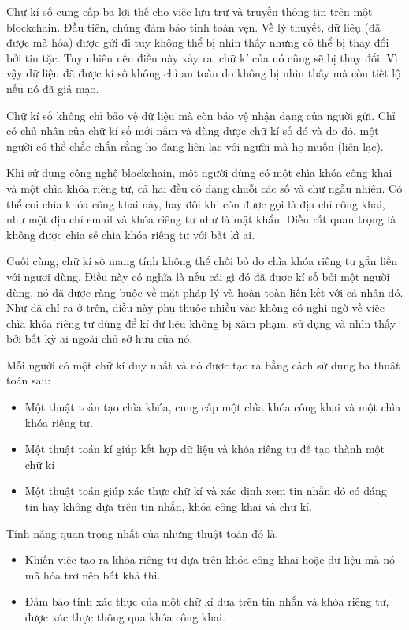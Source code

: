  Chữ kí số cung cấp ba lợi thế cho việc lưu trữ và truyền thông tin trên một blockchain. Đầu tiên, chúng đảm bảo tính toàn vẹn. Về lý thuyết, dữ liêụ (đã được mã hóa) được gửi đi tuy không thể bị nhìn thấy nhưng có thể bị thay đổi bởi tin tặc. Tuy nhiên nếu điều này xảy ra, chữ kí của nó cũng sẽ bị thay đổi. Vì vậy dữ liệu đã được kí số không chỉ an toàn do không bị nhìn thấy mà còn tiết lộ nếu nó đã giả mạo.
 
 Chữ kí số không chỉ bảo vệ dữ liệu mà còn bảo vệ nhận dạng của người gửi. Chỉ có chủ nhân của chữ kí số mới nắm và dùng được chữ kí số đó và do đó, một người có thể chắc chắn rằng họ đang liên lạc với người mà họ muốn (liên lạc).
 
 Khi sử dụng công nghệ blockchain, một người dùng có một chìa khóa công khai và một chìa khóa riêng tư, cả hai đều có dạng chuỗi các số và chữ ngẫu nhiên. Có thể coi chìa khóa công khai này, hay đôi khi còn được gọi là địa chỉ công khai, như một địa chỉ email và khóa riêng tư như là mật khẩu. Điều rất quan trọng là không được chia sẻ chìa khóa riêng tư với bất kì ai.
 
 Cuối cùng, chữ kí số mang tính không thể chối bỏ do chìa khóa riêng tư gắn liền với ngươi dùng. Điều này có nghĩa là nếu cái gì đó đã được kí số bởi một người dùng, nó đã được ràng buộc về mặt pháp lý và hoàn toàn liên kết với cá nhân đó. Như đã chỉ ra ở trên, điều này phụ thuộc nhiều vào không có nghi ngờ về việc chìa khóa riêng tư dùng để kí dữ liệu không bị xâm phạm, sử dụng và nhìn thấy bởi bất kỳ ai ngoài chủ sở hữu của nó. 
 
 Mỗi người có một chữ kí duy nhất và nó được tạo ra bằng cách sử dụng ba thuât toán sau:
 \begin{itemize}
   \item  Một thuật toán tạo chìa khóa, cung cấp một chìa khóa công khai và một chìa khóa riêng tư.
 \item Một thuật toán kí giúp kết hợp dữ liệu và khóa riêng tư để tạo thành một chữ kí
 \item Một thuật toán giúp xác thực chữ kí và xác định xem tin nhắn đó có đáng tin hay không dựa trên tin nhắn, khóa công khai và chữ kí.
 \end{itemize}

 
 Tính năng quan trọng nhất của những thuật toán đó là:
\begin{itemize}
   \item Khiến việc tạo ra khóa riêng tư dựa trên khóa công khai hoặc dữ liệu mà nó mã hóa trở nên bất khả thi.
 \item Đảm bảo tính xác thực của một chữ kí dưạ trên tin nhắn và khóa riêng tư, được  xác thực thông qua khóa công khai.
 \end{itemize} 
 
